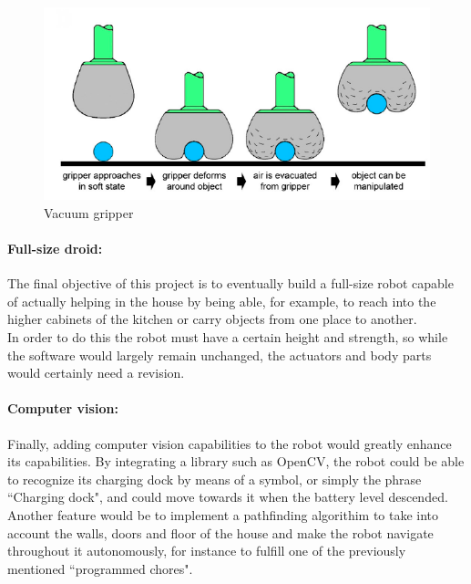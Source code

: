 	\begin{figure}[H]
			\centering
			\includegraphics[scale=0.7]{images/Conclusion/gripper.png}
			\caption{Vacuum gripper  }
			\label{gripper}
	\end{figure}
	\bigskip


\paragraph{Full-size droid:} The final objective of this project is to eventually build a full-size robot capable of actually helping in the house by being able, for example, to reach into the higher cabinets of the kitchen or carry objects from one place to another.\\ 

In order to do this the robot must have a certain height and strength, so while the software would largely remain unchanged, the actuators and body parts would certainly need a revision. 


\paragraph{Computer vision:} Finally, adding computer vision capabilities to the robot would greatly enhance its capabilities. By integrating a library such as OpenCV, the robot could be able to recognize its charging dock by means of a symbol, or simply the phrase ``Charging dock", and could move towards it when the battery level descended.\\

Another feature would be to implement a pathfinding algorithim to take into account the walls, doors and floor of the house and make the robot navigate throughout it autonomously, for instance to fulfill one of the previously mentioned ``programmed chores".
